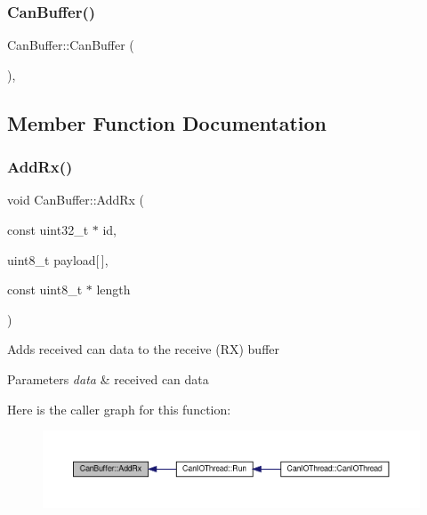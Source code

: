 \subsubsection{\texorpdfstring{Can\+Buffer()}{CanBuffer()}\hspace{0.1cm}{\footnotesize\ttfamily [2/2]}}
{\footnotesize\ttfamily Can\+Buffer\+::\+Can\+Buffer (\begin{DoxyParamCaption}{ }\end{DoxyParamCaption})\hspace{0.3cm}{\ttfamily [inline]}, {\ttfamily [private]}}



\subsection{Member Function Documentation}
\mbox{\label{classCanBuffer_a2038c19fd2b63223a86a48a8faef2996}} 
\subsubsection{\texorpdfstring{Add\+Rx()}{AddRx()}}
{\footnotesize\ttfamily void Can\+Buffer\+::\+Add\+Rx (\begin{DoxyParamCaption}\item[{const uint32\+\_\+t $\ast$}]{id,  }\item[{uint8\+\_\+t}]{payload\mbox{[}$\,$\mbox{]},  }\item[{const uint8\+\_\+t $\ast$}]{length }\end{DoxyParamCaption})}


\begin{DoxyItemize}
\item Adds received can data to the receive (RX) buffer 
\begin{DoxyParams}{Parameters}
{\em data} & received can data \\
\hline
\end{DoxyParams}

\end{DoxyItemize}Here is the caller graph for this function\+:
\nopagebreak
\begin{figure}[H]
\begin{center}
\leavevmode
\includegraphics[width=350pt]{classCanBuffer_a2038c19fd2b63223a86a48a8faef2996_icgraph}
\end{center}
\end{figure}
\mbox{\label{classCanBuffer_a9f61d33ebf8b9b98fb30998074351b90}} 
